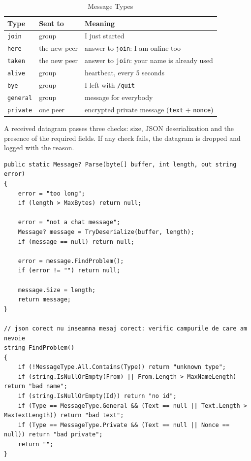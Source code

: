 \documentclass[11pt, a4paper]{article}
\begin{document}
\begin{table}[h]
\centering
\caption{Message Types}
\label{tab:messages}
\begin{tabularx}{\textwidth}{@{}llX@{}}
\toprule
\textbf{Type} & \textbf{Sent to} & \textbf{Meaning} \\ \midrule
\texttt{join} & group & I just started \\
\texttt{here} & the new peer & answer to \texttt{join}: I am online too \\
\texttt{taken} & the new peer & answer to \texttt{join}: your name is already used \\
\texttt{alive} & group & heartbeat, every 5 seconds \\
\texttt{bye} & group & I left with \texttt{/quit} \\
\texttt{general} & group & message for everybody \\
\texttt{private} & one peer & encrypted private message (\texttt{text} + \texttt{nonce}) \\ \bottomrule
\end{tabularx}
\end{table}

A received datagram passes three checks: size, JSON deserialization and the presence of the required fields. If any check fails, the datagram is dropped and logged with the reason.

\begin{lstlisting}[caption={Validating a datagram (\texttt{Message.cs})}]
public static Message? Parse(byte[] buffer, int length, out string error)
{
    error = "too long";
    if (length > MaxBytes) return null;

    error = "not a chat message";
    Message? message = TryDeserialize(buffer, length);
    if (message == null) return null;

    error = message.FindProblem();
    if (error != "") return null;

    message.Size = length;
    return message;
}

// json corect nu inseamna mesaj corect: verific campurile de care am nevoie
string FindProblem()
{
    if (!MessageType.All.Contains(Type)) return "unknown type";
    if (string.IsNullOrEmpty(From) || From.Length > MaxNameLength) return "bad name";
    if (string.IsNullOrEmpty(Id)) return "no id";
    if (Type == MessageType.General && (Text == null || Text.Length > MaxTextLength)) return "bad text";
    if (Type == MessageType.Private && (Text == null || Nonce == null)) return "bad private";
    return "";
}
\end{lstlisting}
\end{document}

